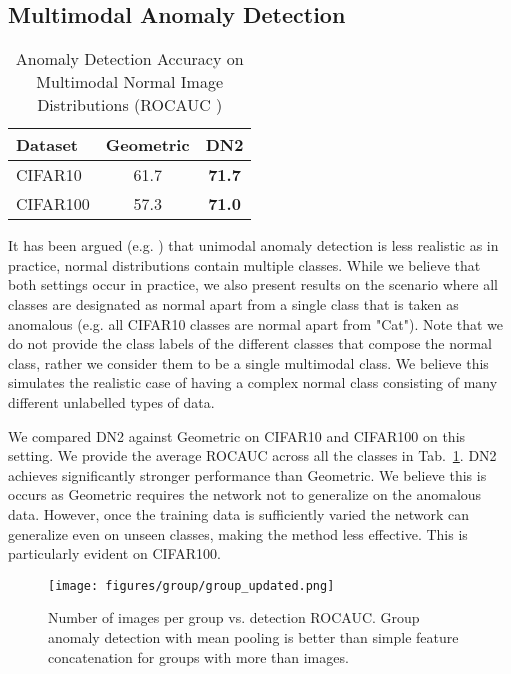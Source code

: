 \documentclass{article}
\begin{document}
\subsection{Multimodal Anomaly Detection}
\label{subsec:exp:multi}

\begin{table}
  \centering
  \caption{Anomaly Detection Accuracy on Multimodal Normal Image Distributions (ROCAUC )}
  

    \begin{tabular}{lcc}
     \toprule      

      Dataset & Geometric & DN2 \\
      \midrule
      CIFAR10 & 61.7 & \textbf{71.7}   \\
      CIFAR100 & 57.3 & \textbf{71.0} \\
      \bottomrule
    \end{tabular}
    \label{tab:exp_multi}
\end{table}

It has been argued (e.g. \citet{ahmed2019detecting}) that unimodal anomaly detection is less realistic as in practice, normal distributions contain multiple classes. While we believe that both settings occur in practice, we also present results on the scenario where all classes are designated as normal apart from a single class that is taken as anomalous (e.g. all CIFAR10 classes are normal apart from "Cat"). Note that we do not provide the class labels of the different classes that compose the normal class, rather we consider them to be a single multimodal class. We believe this simulates the realistic case of having a complex normal class consisting of many different unlabelled types of data.

We compared DN2 against Geometric on CIFAR10 and CIFAR100 on this setting. We provide the average ROCAUC across all the classes in Tab.~\ref{tab:exp_multi}. DN2 achieves significantly stronger performance than Geometric. We believe this is occurs as Geometric requires the network not to generalize on the anomalous data. However, once the training data is sufficiently varied the network can generalize even on unseen classes, making the method less effective. This is particularly evident on CIFAR100.  

\begin{figure}
  \centering
  
  \label{fig:group}

   \texttt{[image: figures/group/group\_updated.png]}
    \caption{Number of images per group vs. detection ROCAUC. Group anomaly detection with mean pooling is better than simple feature concatenation for groups with more than  images.}
\end{figure}
\end{document}
